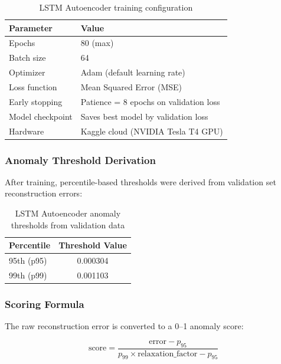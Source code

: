 \begin{table}[h]
\centering
\begin{tabular}{|l|l|}
\hline
\textbf{Parameter} & \textbf{Value} \\
\hline
Epochs & 80 (max) \\
\hline
Batch size & 64 \\
\hline
Optimizer & Adam (default learning rate) \\
\hline
Loss function & Mean Squared Error (MSE) \\
\hline
Early stopping & Patience = 8 epochs on validation loss \\
\hline
Model checkpoint & Saves best model by validation loss \\
\hline
Hardware & Kaggle cloud (NVIDIA Tesla T4 GPU) \\
\hline
\end{tabular}
\caption{LSTM Autoencoder training configuration}
\label{tab:lstm_training}
\end{table}

\subsubsection{Anomaly Threshold Derivation}

After training, percentile-based thresholds were derived from validation set reconstruction errors:

\begin{table}[h]
\centering
\begin{tabular}{|l|c|}
\hline
\textbf{Percentile} & \textbf{Threshold Value} \\
\hline
95th (p95) & 0.000304 \\
\hline
99th (p99) & 0.001103 \\
\hline
\end{tabular}
\caption{LSTM Autoencoder anomaly thresholds from validation data}
\label{tab:lstm_thresholds}
\end{table}

\subsubsection{Scoring Formula}

The raw reconstruction error is converted to a 0--1 anomaly score:

\begin{equation}
\text{score} = \frac{\text{error} - p_{95}}{p_{99} \times \text{relaxation\_factor} - p_{95}}
\end{equation}

